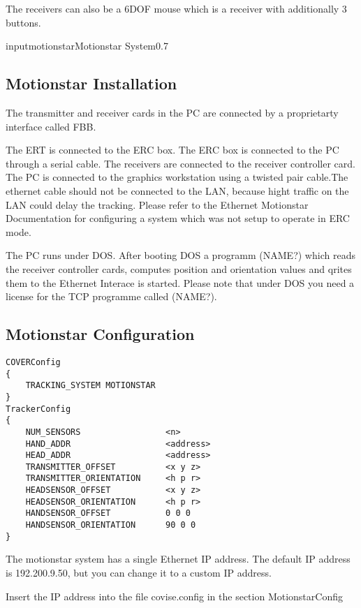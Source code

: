 The receivers can also be a 6DOF mouse which is a receiver with additionally 3 buttons.

\begin{covimg}{input}{motionstar}{Motionstar System}{0.7}\end{covimg}


\subsection{Motionstar Installation}
The transmitter and receiver cards in the PC are connected by a proprietarty interface called FBB.

The ERT is connected to the ERC box. The ERC box is connected to the PC through a serial cable.
The receivers are connected to the receiver controller card. The PC is connected to the graphics workstation
using a twisted pair cable.The ethernet cable should not be connected to the LAN, because hight traffic on the
LAN could delay the tracking. Please refer to the Ethernet Motionstar Documentation for configuring
a system which was not setup to operate in ERC mode.

The PC runs under DOS. After booting DOS a programm  (NAME?) which reads the receiver controller cards,
computes position and orientation values and qrites them to the Ethernet Interace is started.
Please note that under DOS you need a license for the TCP programme called (NAME?).

\subsection{Motionstar Configuration}
\begin{samepage}
\small \begin{verbatim}
COVERConfig
{
    TRACKING_SYSTEM MOTIONSTAR
}
TrackerConfig
{
    NUM_SENSORS                 <n>
    HAND_ADDR                   <address>
    HEAD_ADDR                   <address>
    TRANSMITTER_OFFSET          <x y z>
    TRANSMITTER_ORIENTATION     <h p r>     
    HEADSENSOR_OFFSET           <x y z>
    HEADSENSOR_ORIENTATION      <h p r>
    HANDSENSOR_OFFSET           0 0 0
    HANDSENSOR_ORIENTATION      90 0 0
}
\end{verbatim} \normalsize
\end{samepage}
The motionstar system  has a single Ethernet IP address. The default IP address is 192.200.9.50, but you can
change it to a custom IP address. 

Insert the IP address into the file covise.config in the section MotionstarConfig


